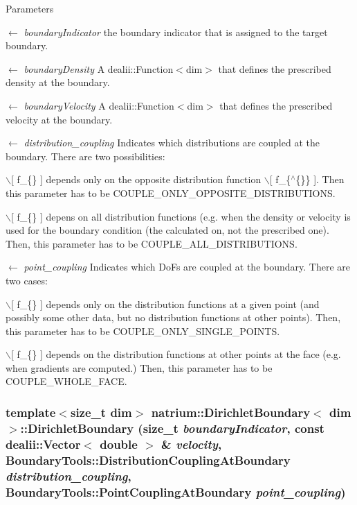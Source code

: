 \begin{DoxyParams}{Parameters}
\item[\mbox{$\leftarrow$} {\em boundaryIndicator}]the boundary indicator that is assigned to the target boundary. \item[\mbox{$\leftarrow$} {\em boundaryDensity}]A dealii::Function$<$dim$>$ that defines the prescribed density at the boundary. \item[\mbox{$\leftarrow$} {\em boundaryVelocity}]A dealii::Function$<$dim$>$ that defines the prescribed velocity at the boundary. \item[\mbox{$\leftarrow$} {\em distribution\_\-coupling}]Indicates which distributions are coupled at the boundary. There are two possibilities:
\begin{DoxyEnumerate}
\item $\backslash$\mbox{[} f\_\-\{\} \mbox{]} depends only on the opposite distribution function $\backslash$\mbox{[} f\_\-\{$^\wedge$\{\}\} \mbox{]}. Then this parameter has to be COUPLE\_\-ONLY\_\-OPPOSITE\_\-DISTRIBUTIONS.
\item $\backslash$\mbox{[} f\_\-\{\} \mbox{]} depens on all distribution functions (e.g. when the density or velocity is used for the boundary condition (the calculated on, not the prescribed one). Then, this parameter has to be COUPLE\_\-ALL\_\-DISTRIBUTIONS. 
\end{DoxyEnumerate}\item[\mbox{$\leftarrow$} {\em point\_\-coupling}]Indicates which DoFs are coupled at the boundary. There are two cases:
\begin{DoxyEnumerate}
\item $\backslash$\mbox{[} f\_\-\{\} \mbox{]} depends only on the distribution functions at a given point (and possibly some other data, but no distribution functions at other points). Then, this parameter has to be COUPLE\_\-ONLY\_\-SINGLE\_\-POINTS.
\item $\backslash$\mbox{[} f\_\-\{\} \mbox{]} depends on the distribution functions at other points at the face (e.g. when gradients are computed.) Then, this parameter has to be COUPLE\_\-WHOLE\_\-FACE. 
\end{DoxyEnumerate}\end{DoxyParams}
\hypertarget{classnatrium_1_1DirichletBoundary_a7f0b83d5c09a113a1c9ad025704962f9}{
\subsubsection[{DirichletBoundary}]{\setlength{\rightskip}{0pt plus 5cm}template$<$size\_\-t dim$>$ {\bf natrium::DirichletBoundary}$<$ dim $>$::{\bf DirichletBoundary} (size\_\-t {\em boundaryIndicator}, \/  const dealii::Vector$<$ double $>$ \& {\em velocity}, \/  BoundaryTools::DistributionCouplingAtBoundary {\em distribution\_\-coupling}, \/  BoundaryTools::PointCouplingAtBoundary {\em point\_\-coupling})}}
\label{classnatrium_1_1DirichletBoundary_a7f0b83d5c09a113a1c9ad025704962f9}


